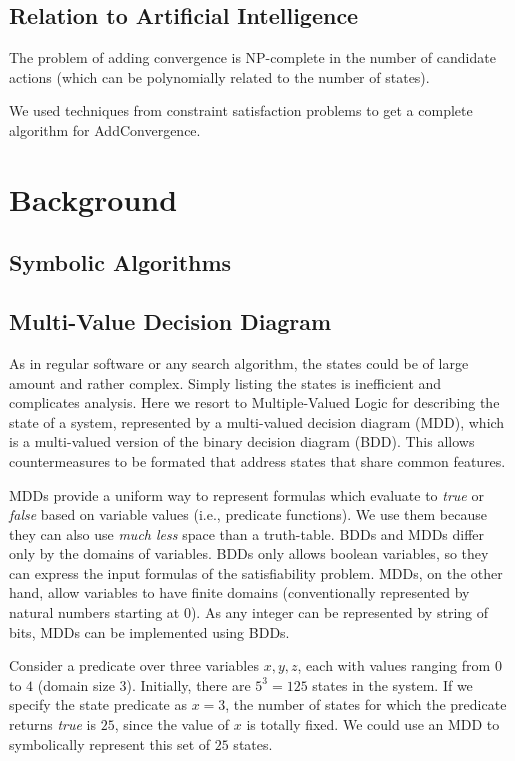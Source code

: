 \subsection{Relation to Artificial Intelligence}

The problem of adding convergence is NP-complete in the number of candidate actions (which can be polynomially related to the number of states).

We used techniques from constraint satisfaction problems to get a complete algorithm for AddConvergence.


\section{Background}

\subsection{Symbolic Algorithms}

\subsection{Multi-Value Decision Diagram}
As in regular software or any search algorithm, the states could be of large amount and rather complex. Simply listing the states is inefficient and complicates analysis. Here we resort to Multiple-Valued Logic for describing the state of a system, represented by a multi-valued decision diagram (MDD), which is a multi-valued version of the binary decision diagram (BDD).
This allows countermeasures to be formated that address states that share common features. 

MDDs provide a uniform way to represent formulas which evaluate to {\it true} or {\it false} based on variable values (i.e., predicate functions).
We use them because they can also use {\em much less} space than a truth-table.
BDDs and MDDs differ only by the domains of variables. BDDs only allows boolean variables, so they can express the input formulas of the satisfiability problem.
MDDs, on the other hand, allow variables to have finite domains (conventionally represented by natural numbers starting at $0$).
As any integer can be represented by string of bits, MDDs can be implemented using BDDs.

Consider a predicate over three variables $x, y, z$, each with values ranging from $0$ to $4$ (domain size 3). Initially, there are $5^3 = 125$ states in the system. If we specify the state predicate as $x=3$, the number of states for which the predicate returns {\it true} is $25$, since the value of $x$ is totally fixed. We could use an MDD to symbolically represent this set of $25$ states.

